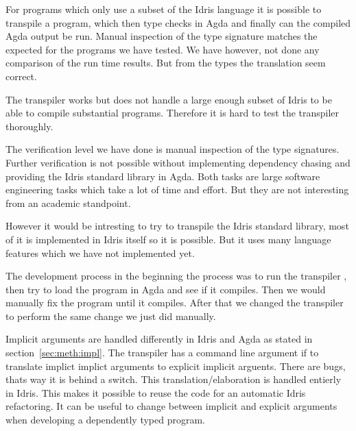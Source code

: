For programs which only use a subset of the Idris
language it is possible to transpile a program, which then type checks in Agda
and finally can the compiled Agda output be run. Manual inspection of the type
signature matches the expected for the programs we have tested. We have
however, not done any comparison of the run time results. But from the types
the translation seem correct.

The transpiler works but does not handle a large enough subset of Idris to be
able to compile substantial programs. Therefore it is hard to test the
transpiler thoroughly.


The verification level we have done is manual inspection of the type
signatures. Further verification is not possible without implementing
dependency chasing and providing the Idris standard library in Agda. Both tasks
are large software engineering tasks which take a lot of time and effort. But
they are not interesting from an academic standpoint.

However it would be intresting to try to transpile the Idris standard library,
most of it is implemented in Idris itself so it is possible. But it uses many
language features which we have not implemented yet.

The development process in the beginning the process was to run the transpiler
, then try to load the program in Agda and see if it compiles.  Then we would
manually fix the program until it compiles.  After that we changed the
transpiler to perform the same change we just did manually.



 Implicit arguments are handled differently in Idris and Agda as
stated in section~\ref{sec:meth:impl}. The transpiler has a command line
argument if to translate implict implict arguments to explicit implicit
arguents. There are bugs, thats way it is behind a switch. This
translation/elaboration is handled entierly in Idris. This makes it possible to
reuse the code for an automatic Idris refactoring.  It can be useful to change
between implicit and explicit arguments when developing a dependently typed
program.


